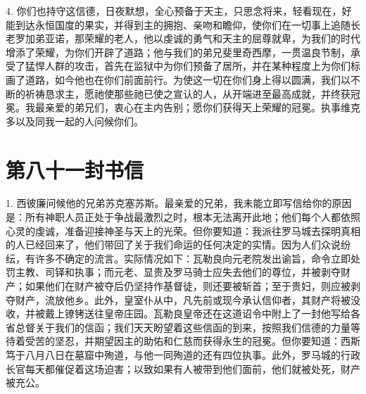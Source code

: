 4. 你们也持守这信德，日夜默想，全心预备于天主，只思念将来，轻看现在，好能到达永恒国度的果实，并得到主的拥抱、亲吻和瞻仰，使你们在一切事上追随长老罗加弟亚诺，那荣耀的老人，他以虔诚的勇气和天主的屈尊就卑，为我们的时代增添了荣耀，为你们开辟了道路；他与我们的弟兄斐里奇西摩，一贯温良节制，承受了猛悍人群的攻击，首先在监狱中为你们预备了居所，并在某种程度上为你们标画了道路，如今他也在你们前面前行。为使这一切在你们身上得以圆满，我们以不断的祈祷恳求主，愿祂使那些祂已使之宣认的人，从开端进至最高成就，并终获冠冕。我最亲爱的弟兄们，衷心在主内告别；愿你们获得天上荣耀的冠冕。执事维克多以及同我一起的人问候你们。\par



\section{第八十一封书信}

\par

\par

1. 西彼廉问候他的兄弟苏克塞苏斯。最亲爱的兄弟，我未能立即写信给你的原因是：所有神职人员正处于争战最激烈之时，根本无法离开此地；他们每个人都依照心灵的虔诚，准备迎接神圣与天上的光荣。但你要知道：我派往罗马城去探明真相的人已经回来了，他们带回了关于我们命运的任何决定的实情。因为人们众说纷纭，有许多不确定的流言。实际情况如下：瓦勒良向元老院发出谕旨，命令立即处罚主教、司铎和执事；而元老、显贵及罗马骑士应失去他们的尊位，并被剥夺财产；如果他们在财产被夺后仍坚持作基督徒，则还要被斩首；至于贵妇，则应被剥夺财产，流放他乡。此外，皇室仆从中，凡先前或现今承认信仰者，其财产将被没收，并被戴上镣铐送往皇帝庄园。瓦勒良皇帝还在这道诏令中附上了一封他写给各省总督关于我们的信函；我们天天盼望着这些信函的到来，按照我们信德的力量等待着受苦的坚忍，并期望因主的助佑和仁慈而获得永生的冠冕。但你要知道：西斯笃于八月八日在墓窟中殉道，与他一同殉道的还有四位执事。此外，罗马城的行政长官每天都催促着这场迫害；以致如果有人被带到他们面前，他们就被处死，财产被充公。\par

